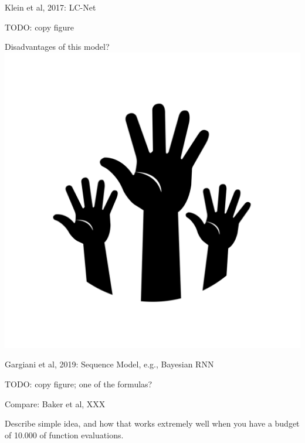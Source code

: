 \begin{frame}[c,fragile]{Klein et al, 2017: LC-Net}

TODO: copy figure

Disadvantages of this model? \includegraphics[height=0.1\textheight]{images/hands.png}

\end{frame}



\begin{frame}[c,fragile]{Gargiani et al, 2019: Sequence Model, e.g., Bayesian RNN}

TODO: copy figure; one of the formulas?


\end{frame}

\begin{frame}[c,fragile]{Compare: Baker et al, XXX}

Describe simple idea, and how that works extremely well when you have a budget of 10.000 of function evaluations.

\end{frame}






